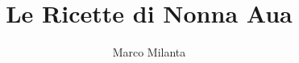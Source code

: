 \documentclass[11pt]{book}
\begin{document}
\author{Marco Milanta}
\title{Le Ricette di Nonna Aua}
\maketitle

\tableofcontents

\end{document}
